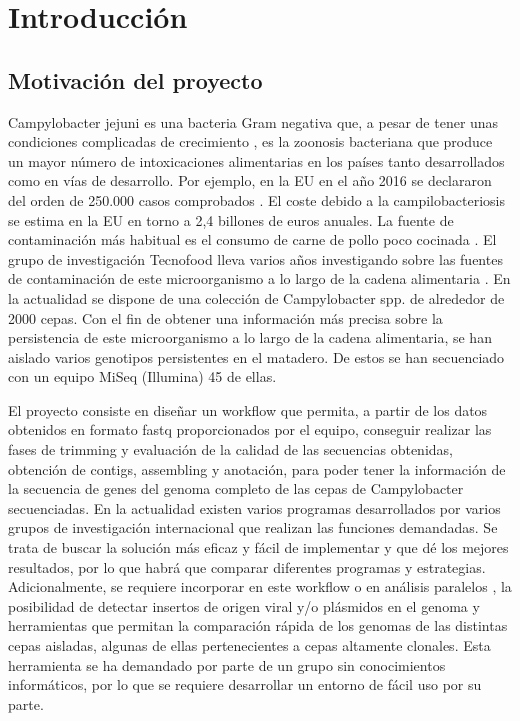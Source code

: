 \chapter{Introducción} 
\label{chap:intro}

\vspace{-0.2cm}

\section{Motivación del proyecto}
Campylobacter jejuni es una bacteria Gram negativa que, a pesar de tener unas condiciones complicadas de crecimiento \cite{garciasanchez2017}, es la zoonosis bacteriana que produce un mayor número de intoxicaciones alimentarias en los países tanto desarrollados como en vías de desarrollo. Por ejemplo, en la EU en el año 2016 se declararon del orden de 250.000 casos comprobados \cite{report2016}. El coste debido a la campilobacteriosis se estima en la EU en torno a 2,4 billones de euros anuales. La fuente de contaminación más habitual es el consumo de carne de pollo poco cocinada \cite{GarciaSanchez2018}. El grupo de investigación Tecnofood lleva varios años investigando sobre las fuentes de contaminación de este microorganismo a lo largo de la cadena alimentaria \cite{garciasanchez2017} \cite{GarciaSanchez2018} \cite{Melero2012}. En la actualidad se dispone de una colección de Campylobacter spp. de alrededor de 2000 cepas. Con el fin de obtener una información más precisa sobre la persistencia de este microorganismo a lo largo de la cadena alimentaria, se han aislado varios genotipos persistentes en el matadero. De estos se han secuenciado con un equipo MiSeq (Illumina) 45 de ellas.

El proyecto consiste en diseñar un workflow que permita, a partir de los datos obtenidos en formato fastq proporcionados por el equipo, conseguir realizar las fases de trimming y evaluación de la calidad de las secuencias obtenidas, obtención de contigs, assembling y anotación, para poder tener la información de la secuencia de genes del genoma completo  \cite{Clark2016} \cite{Llarena2017} \cite{Zhao2016} de las cepas de Campylobacter secuenciadas. En la actualidad existen varios programas desarrollados por varios grupos de investigación internacional que realizan las funciones demandadas. Se trata de buscar la solución más eficaz y fácil de implementar y que dé los mejores resultados, por lo que habrá que comparar diferentes programas y estrategias. Adicionalmente, se requiere incorporar en este workflow o en análisis paralelos \cite{Skarp2015}, la posibilidad de detectar insertos de origen viral y/o plásmidos en el genoma y herramientas que permitan la comparación rápida de los genomas de las distintas cepas aisladas, algunas de ellas pertenecientes a cepas altamente clonales. Esta herramienta se ha demandado por parte de un grupo sin conocimientos informáticos, por lo que se requiere desarrollar un entorno de fácil uso por su parte.


